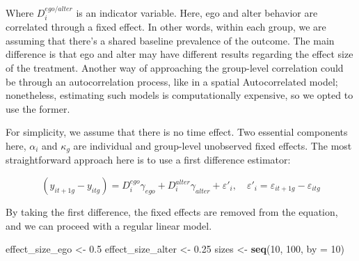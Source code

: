 \documentclass[
]{book}
\newenvironment{Shaded}{\begin{snugshade}}{\end{snugshade}}
\newcommand{\AttributeTok}[1]{\textcolor[rgb]{0.13,0.29,0.53}{#1}}
\newcommand{\DecValTok}[1]{\textcolor[rgb]{0.00,0.00,0.81}{#1}}
\newcommand{\FloatTok}[1]{\textcolor[rgb]{0.00,0.00,0.81}{#1}}
\newcommand{\FunctionTok}[1]{\textcolor[rgb]{0.13,0.29,0.53}{\textbf{#1}}}
\newcommand{\NormalTok}[1]{#1}
\newcommand{\OtherTok}[1]{\textcolor[rgb]{0.56,0.35,0.01}{#1}}
\begin{document}
Where \(D_i^{ego/alter}\) is an indicator variable. Here, ego and alter behavior are correlated through a fixed effect. In other words,
within each group, we are assuming that there's a shared baseline prevalence of
the outcome. The main difference is that ego and alter may have different results
regarding the effect size of the treatment. Another way of approaching the group-level
correlation could be through an autocorrelation process, like in a spatial Autocorrelated
model; nonetheless, estimating such models is computationally expensive, so we
opted to use the former.

For simplicity, we assume that there is no time effect. Two essential components here,
\(\alpha_i\) and \(\kappa_g\) are individual and group-level unobserved fixed effects.
The most straightforward approach here is to use a first difference estimator:

\[
(y_{it+1g} - y_{itg}) = D_{i}^{ego}\gamma_{ego} + D_i^{alter}\gamma_{alter}  + \varepsilon'_i, \quad \varepsilon'_i = \varepsilon_{it+1g} - \varepsilon_{itg}
\]

By taking the first difference, the fixed effects are removed from the equation,
and we can proceed with a regular linear model.

\begin{Shaded}
\begin{Highlighting}[]
\NormalTok{effect\_size\_ego   }\OtherTok{\textless{}{-}} \FloatTok{0.5}
\NormalTok{effect\_size\_alter }\OtherTok{\textless{}{-}} \FloatTok{0.25}
\NormalTok{sizes }\OtherTok{\textless{}{-}} \FunctionTok{seq}\NormalTok{(}\DecValTok{10}\NormalTok{, }\DecValTok{100}\NormalTok{, }\AttributeTok{by =} \DecValTok{10}\NormalTok{)}
\end{Highlighting}
\end{Shaded}
\end{document}
